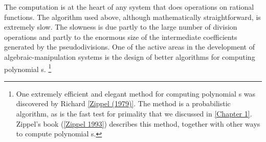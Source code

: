 The  computation is at the heart of any system that does operations on rational functions.
The algorithm used above, although mathematically straightforward, is extremely slow.
The slowness is due partly to the large number of division operations and partly to the enormous size of the intermediate coefficients generated by the pseudodivisions.
One of the active areas in the development of algebraic-manipulation systems is the design of better algorithms for computing polynomial s.%
\footnote{
	One extremely efficient and elegant method for computing polynomial s was discovered by Richard \cref{Zippel (1979)}.
	The method is a probabilistic algorithm, as is the fast test for primality that we discussed in \cref{Chapter 1}.
	Zippel’s book (\cref{Zippel 1993}) describes this method, together with other ways to compute polynomial s.
}
